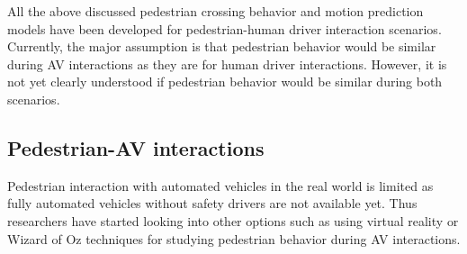 \documentclass[letter,journal]{IEEEtran}
\begin{document}
All the above discussed pedestrian crossing behavior and motion prediction models have been developed for pedestrian-human driver interaction scenarios. Currently, the major assumption is that pedestrian behavior would be similar during AV interactions as they are for human driver interactions. However, it is not yet clearly understood if pedestrian behavior would be similar during both scenarios.








\subsection{Pedestrian-AV interactions}

Pedestrian interaction with automated vehicles in the real world is limited as fully automated vehicles without safety drivers are not available yet. Thus researchers have started looking into other options such as using virtual reality \cite{jayaraman2018trust} or Wizard of Oz techniques \cite{rothenbucher2016ghost,habibovic2018communicating} for studying pedestrian behavior during AV interactions. \\
\end{document}
